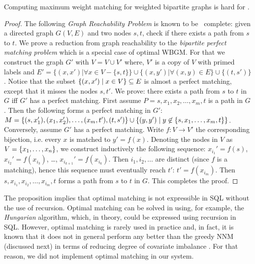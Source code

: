 {{\vspace{-.2cm}
\begin{proposition} \label{pro:om}
Computing  maximum weight matching for  weighted bipartite graphs is hard for \NLOGSPACE.
\end{proposition}

\begin{proof} The following {\em Graph Reachability Problem} is known
  to be \NLOGSPACE\ complete: given a directed graph $G(V,E)$ and two
  nodes $s,t$, check if there exists a path from $s$ to $t$.  We prove
  a reduction from graph reachability to the {\em bipartite perfect
    matching problem} which is a special case of optimal WBGM. For
  that we construct the graph $G'$ with $V= V \cup V'$ where, $V'$ is
  a copy of $V$ with primed labels and
  $E'= \{(x,x')| \forall x \in V -\{s,t\} \} \cup \{(x,y')| \forall
  (x,y) \in E\} \cup \{(t,s')\}$.
  Notice that the subset $\{{(x,x')}\mid{x \in V}\} \subseteq E$ is
  almost a perfect matching, except that it misses the nodes $s, t'$.
  We prove: there exists a path from $s$ to $t$ in $G$ iff $G'$ has a
  perfect matching.  First assume $P=s, x_1, x_2, \ldots, x_m, t$ is a
  path in $G$. Then the following forms a perfect matching in $G'$:
  $M=\{(s,x_1'), (x_1,x_2'), \ldots, (x_{m},t'), (t,s')\} \cup
  \{{(y,y')}\mid{y \not\in \{s,x_1, \ldots, x_m,t\}}\}$.
  Conversely, assume $G'$ has a perfect matching. Write
  $f : V \rightarrow V'$ the corresponding bijection, i.e. every $x$
  is matched to $y'=f(x)$.  Denoting the nodes in $V$ as
  $V=\{x_1, \ldots, x_n\}$, we construct inductively the following
  sequence: $x_{i_1}' = f(s)$, $x_{i_2}' = f(x_{i_3})$, \ldots,
  $x_{i_{k+1}}' = f(x_{i_k})$.  Then $i_1, i_2, \ldots$ are distinct
  (since $f$ is a matching), hence this sequence must eventually reach
  $t'$: $t' = f(x_{i_m})$.  Then
  $s,x_{i_1},x_{i_2}, \ldots, x_{i_m}, t$ forms a path from $s$ to $t$
  in $G$.  This completes the proof.
\end{proof}

The proposition implies that optimal matching is not expressible in
SQL without the use of recursion.  Optimal matching can be solved in
\PTIME using, for example, the {\em Hungarian} algorithm, which, in
theory, could be expressed using recursion in SQL.  However, optimal
matching is rarely used in practice and, in fact, it is known that it
does not in general perform any better than the greedy NNM (discussed
next) in terms of reducing degree of covariate imbalance
\cite{Rosenbaum93}.   For that reason, we did not implement optimal
matching in our system.


}}
